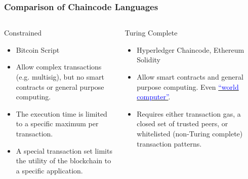 \documentclass[8pt]{beamer}
\begin{document}
\begin{frame}
\frametitle{Comparison of Chaincode Languages}

\begin{columns}
\begin{column}{0.5\textwidth}
Constrained
\begin{itemize}
 \item Bitcoin Script
 \item Allow complex transactions (e.g. multisig), but no smart contracts or general purpose computing.
 \item The execution time is limited to a specific maximum per transaction.
 \item A special transaction set limits the utility of the blockchain to a specific application.
\end{itemize}
\end{column}
\begin{column}{0.5\textwidth}
Turing Complete
\begin{itemize}
 \item Hyperledger Chaincode, Ethereum Solidity
 \item Allow smart contracts and general purpose computing. Even \href{https://en.wikipedia.org/wiki/Synereo}{\textcolor{blue}{``world computer''}}.
 \item Requires either transaction gas, a closed set of trusted peers, or whitelisted (non-Turing complete) transaction patterns.
\end{itemize}
\end{column}
\end{columns}

\end{frame}

{

}
\end{document}
